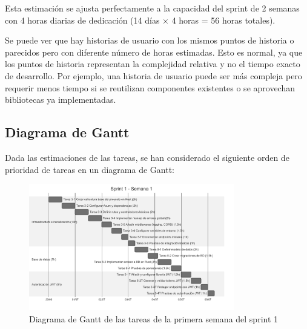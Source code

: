 Esta estimación se ajusta perfectamente a la capacidad del sprint de 2 semanas con 4 horas diarias de dedicación (14 días × 4 horas = 56 horas totales).

Se puede ver que hay historias de usuario con los mismos puntos de historia o parecidos pero con diferente número de horas estimadas. Esto es normal, ya que los puntos de historia representan la complejidad relativa y no el tiempo exacto de desarrollo. Por ejemplo, una historia de usuario puede ser más compleja pero requerir menos tiempo si se reutilizan componentes existentes o se aprovechan bibliotecas ya implementadas.

\subsection{Diagrama de Gantt}
Dada las estimaciones de las tareas, se han considerado el siguiente orden de prioridad de tareas en un diagrama de Gantt:
\begin{figure}[H]
    \begin{center}
        \includegraphics[width=0.8\textwidth]{assets/sprint1/sprint1-week1.png}
    \end{center}
    \caption{Diagrama de Gantt de las tareas de la primera semana del sprint 1}\label{fig:sprint1-week1}
\end{figure}

